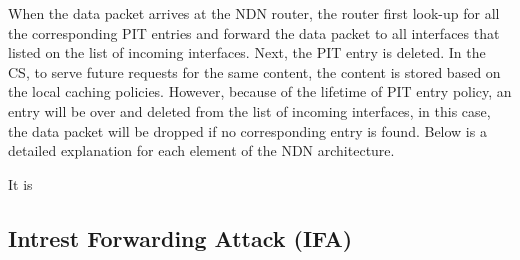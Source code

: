 \documentclass[twocolumn]{article}
\begin{document}
When the data packet arrives at the NDN router, the router first look-up for all the corresponding PIT entries and forward the data packet to all interfaces that listed on the list of incoming interfaces. Next, the PIT entry is deleted. In the CS, to serve future requests for the same content, the content is stored based on the local caching policies. However, because of the lifetime of PIT entry policy, an entry will be over and deleted from the list of incoming interfaces, in this case, the data packet will be dropped if no corresponding entry is found.
Below is a detailed explanation for each element of the NDN architecture.


  
It is \cite{zhang2010named}



\subsection{Intrest Forwarding Attack (IFA)}




\end{document}
